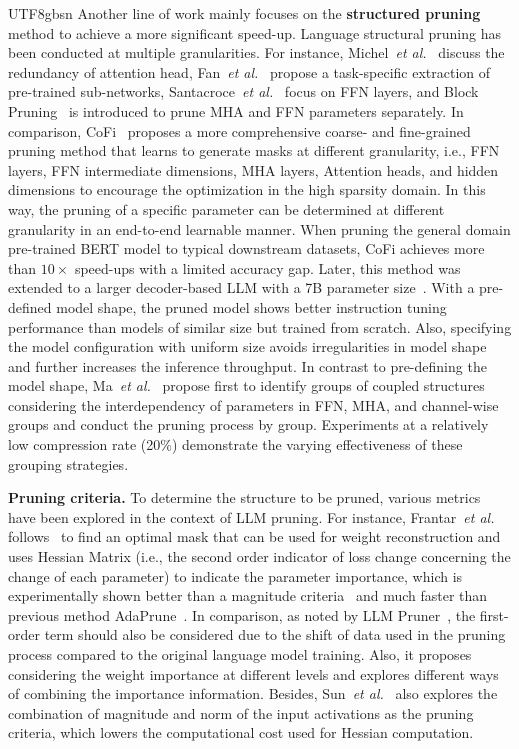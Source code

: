 \documentclass[10pt,journal,compsoc]{IEEEtran}
\newcommand{\etal}{\emph{et al.}}
\newcommand{\<}{\left\langle}
\renewcommand{\>}{\right\rangle}
\newcommand{\1}{\mathbbm{1}}
\begin{document}
\begin{CJK}{UTF8}{gbsn}
Another line of work mainly focuses on the \textbf{structured pruning} method to achieve a more significant speed-up. Language structural pruning has been conducted at multiple granularities. For instance, Michel~\etal~\cite{Michel2019AreSH} discuss the redundancy of attention head, Fan~\etal~\cite{Fan2019ReducingTD} propose a task-specific extraction of pre-trained sub-networks, Santacroce~\etal~\cite{Santacroce2023WhatMI} focus on FFN layers, and Block Pruning~\cite{lagunas-etal-2021-block} is introduced to prune MHA and FFN parameters separately. In comparison, CoFi~\cite{Xia2022StructuredPL} proposes a more comprehensive coarse- and fine-grained pruning method that learns to generate masks at different granularity, i.e., FFN layers, FFN intermediate dimensions, MHA layers, Attention heads, and hidden dimensions to encourage the optimization in the high sparsity domain. In this way, the pruning of a specific parameter can be determined at different granularity in an end-to-end learnable manner. When pruning the general domain pre-trained BERT model to typical downstream datasets, CoFi achieves more than $10\times$ speed-ups with a limited accuracy gap. Later, this method was extended to a larger decoder-based LLM with a 7B parameter size~\cite{Xia2023ShearedLA}. With a pre-defined model shape, the pruned model shows better instruction tuning performance than models of similar size but trained from scratch. Also, specifying the model configuration with uniform size avoids irregularities in model shape and further increases the inference throughput. In contrast to pre-defining the model shape, Ma~\etal~\cite{Ma2023LLMPrunerOT} propose first to identify groups of coupled structures considering the interdependency of parameters in FFN, MHA, and channel-wise groups and conduct the pruning process by group. Experiments at a relatively low compression rate (20\%) demonstrate the varying effectiveness of these grouping strategies. 

\textbf{Pruning criteria.} To determine the structure to be pruned, various metrics have been explored in the context of LLM pruning. For instance, Frantar~\etal~\cite{Frantar2023SparseGPTML} follows~\cite{Frantar2022OptimalBC} to find an optimal mask that can be used for weight reconstruction and uses Hessian Matrix (i.e., the second order indicator of loss change concerning the change of each parameter) to indicate the parameter importance, which is experimentally shown better than a magnitude criteria~\cite{Zhu2017ToPO} and much faster than previous method AdaPrune~\cite{Hubara2021AcceleratedSN}. In comparison, as noted by LLM Pruner~\cite{Ma2023LLMPrunerOT}, the first-order term should also be considered due to the shift of data used in the pruning process compared to the original language model training. Also, it proposes considering the weight importance at different levels and explores different ways of combining the importance information. Besides, Sun~\etal~\cite{Sun2023ASA} also explores the combination of magnitude and norm of the input activations as the pruning criteria, which lowers the computational cost used for Hessian computation.  


\end{CJK}
\end{document}
